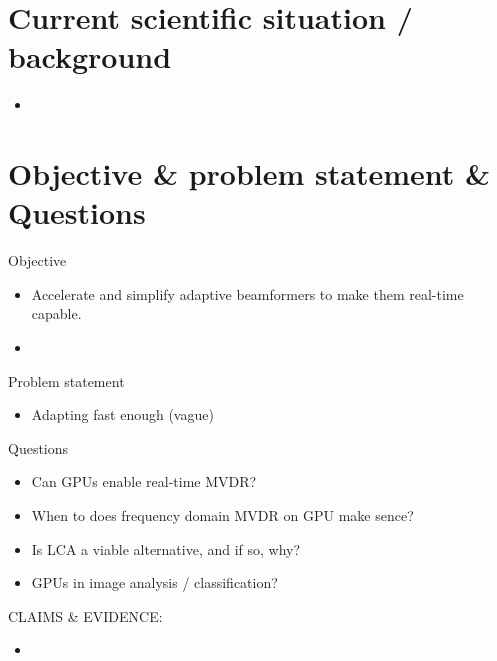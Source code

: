 {\section{Current scientific situation / background}
\begin{itemize}
  \item 
\end{itemize}
% 
\section{Objective \& problem statement \& Questions}
Objective
\begin{itemize}
\item Accelerate and simplify adaptive beamformers to make them real-time capable.
\item 
\end{itemize}
Problem statement
\begin{itemize}
\item Adapting fast enough (vague)
\end{itemize}
Questions
\begin{itemize}
  \item Can GPUs enable real-time MVDR?
  \item When to does frequency domain MVDR on GPU make sence?
  \item Is LCA a viable alternative, and if so, why?
  \item GPUs in image analysis / classification?
\end{itemize}

CLAIMS \& EVIDENCE:
\begin{itemize}
\item 
\end{itemize}

}
